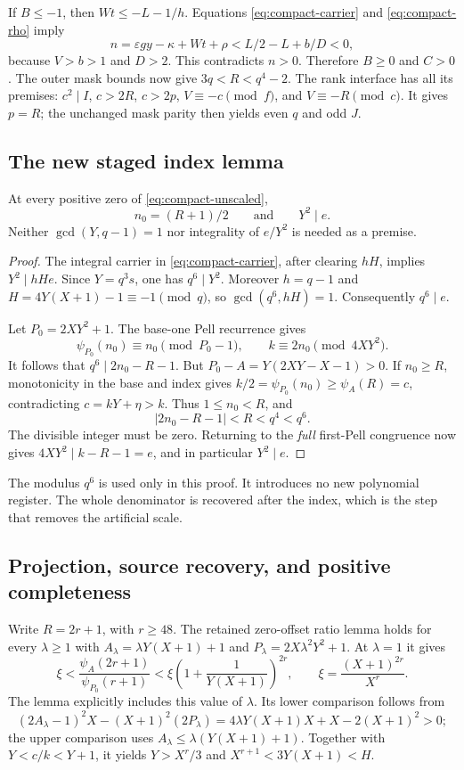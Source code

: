 If $B\le-1$, then $Wt\le-L-1/h$. Equations
\eqref{eq:compact-carrier} and \eqref{eq:compact-rho} imply
\[
 n=\varepsilon gy-\kappa+Wt+\rho
   <L/2-L+b/D<0,
\]
because $V>b>1$ and $D>2$. This contradicts $n>0$. Therefore
$B\ge0$ and $C>0$. The outer mask bounds now give
$3q<R<q^4-2$. The rank interface has all its premises:
$c^2\mid I$, $c>2R$, $c>2p$, $V\equiv-c\pmod f$, and
$V\equiv-R\pmod c$. It gives $p=R$; the unchanged mask parity
then yields even $q$ and odd $J$.

\subsection{The new staged index lemma}

\begin{lemma}
At every positive zero of \eqref{eq:compact-unscaled},
\[
 n_0=(R+1)/2\qquad\text{and}\qquad Y^2\mid e.
\]
Neither $\gcd(Y,q-1)=1$ nor integrality of $e/Y^2$ is needed as a premise.
\end{lemma}

\begin{proof}
The integral carrier in \eqref{eq:compact-carrier}, after clearing
$hH$, implies $Y^2\mid hHe$. Since $Y=q^3s$, one has $q^6\mid Y^2$.
Moreover $h=q-1$ and $H=4Y(X+1)-1\equiv-1\pmod q$, so
$\gcd(q^6,hH)=1$. Consequently $q^6\mid e$.

Let $P_0=2XY^2+1$. The base-one Pell recurrence gives
\[
 \psi_{P_0}(n_0)\equiv n_0\pmod{P_0-1},\qquad
 k\equiv2n_0\pmod{4XY^2}.
\]
It follows that $q^6\mid2n_0-R-1$.
But $P_0-A=Y(2XY-X-1)>0$. If $n_0\ge R$, monotonicity in the
base and index gives $k/2=\psi_{P_0}(n_0)\ge\psi_A(R)=c$,
contradicting $c=kY+\eta>k$. Thus $1\le n_0<R$, and
\[
 |2n_0-R-1|<R<q^4<q^6.
\]
The divisible integer must be zero. Returning to the \emph{full}
first-Pell congruence now gives $4XY^2\mid k-R-1=e$, and in
particular $Y^2\mid e$.
\end{proof}

The modulus $q^6$ is used only in this proof. It introduces no new
polynomial register. The whole denominator is recovered after the
index, which is the step that removes the artificial scale.

\subsection{Projection, source recovery, and positive completeness}

Write $R=2r+1$, with $r\ge48$. The retained zero-offset ratio lemma
holds for every $\lambda\ge1$ with
$A_\lambda=\lambda Y(X+1)+1$ and
$P_\lambda=2X\lambda^2Y^2+1$. At $\lambda=1$ it gives
\[
 \xi<\frac{\psi_A(2r+1)}{\psi_{P_0}(r+1)}
 <\xi\left(1+\frac1{Y(X+1)}\right)^{2r},\qquad
 \xi=\frac{(X+1)^{2r}}{X^r}.
\]
The lemma explicitly includes this value of $\lambda$. Its lower
comparison follows from
\[
 (2A_\lambda-1)^2X-(X+1)^2(2P_\lambda)
 =4\lambda Y(X+1)X+X-2(X+1)^2>0;
\]
the upper comparison uses
$A_\lambda\le\lambda(Y(X+1)+1)$.
Together with $Y<c/k<Y+1$, it yields
$Y>X^r/3$ and $X^{r+1}<3Y(X+1)<H$.

